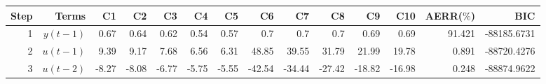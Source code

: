 \begin{tabular}{rrrrrrrrrrrrrr}
Step & Terms & C1 & C2 & C3 & C4 & C5 & C6 & C7 & C8 & C9 & C10 & AERR($\%$) & BIC \\ 
\hline 
1 & $y(t-1)$ & 0.67 & 0.64 & 0.62 & 0.54 & 0.57 & 0.7 & 0.7 & 0.7 & 0.69 & 0.69 & 91.421 & -88185.6731 \\ 
2 & $u(t-1)$ & 9.39 & 9.17 & 7.68 & 6.56 & 6.31 & 48.85 & 39.55 & 31.79 & 21.99 & 19.78 & 0.891 & -88720.4276 \\ 
3 & $u(t-2)$ & -8.27 & -8.08 & -6.77 & -5.75 & -5.55 & -42.54 & -34.44 & -27.42 & -18.82 & -16.98 & 0.248 & -88874.9622 \\ 
\hline 
\end{tabular}